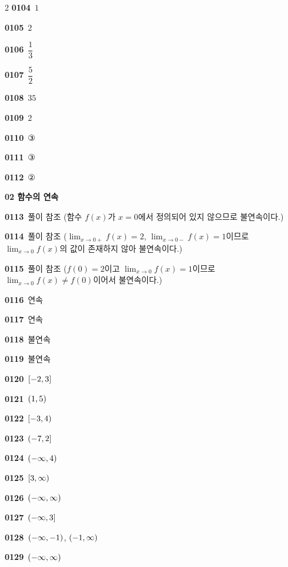 \documentclass[10pt,a4paper]{article}
\begin{document}
\begin{multicols}{2}
\noindent\textbf{0104}\ $1$\par
\noindent\textbf{0105}\ $2$\par
\noindent\textbf{0106}\ $\dfrac{1}{3}$\par
\noindent\textbf{0107}\ $\dfrac{5}{2}$\par
\noindent\textbf{0108}\ $35$\par
\noindent\textbf{0109}\ $2$\par
\noindent\textbf{0110}\ ③\par
\noindent\textbf{0111}\ ③\par
\noindent\textbf{0112}\ ②\par
\noindent\textbf{02 함수의 연속}\par\smallskip
\noindent\textbf{0113}\ 풀이 참조 (함수 $f(x)$가 $x=0$에서 정의되어 있지 않으므로 불연속이다.)\par
\noindent\textbf{0114}\ 풀이 참조 ($\displaystyle\lim_{x\to 0+}f(x)=2$, $\displaystyle\lim_{x\to 0-}f(x)=1$이므로 $\displaystyle\lim_{x\to 0}f(x)$의 값이 존재하지 않아 불연속이다.)\par
\noindent\textbf{0115}\ 풀이 참조 ($f(0)=2$이고 $\displaystyle\lim_{x\to 0}f(x)=1$이므로 $\displaystyle\lim_{x\to 0}f(x)\ne f(0)$이어서 불연속이다.)\par
\noindent\textbf{0116}\ 연속\par
\noindent\textbf{0117}\ 연속\par
\noindent\textbf{0118}\ 불연속\par
\noindent\textbf{0119}\ 불연속\par
\noindent\textbf{0120}\ $[-2{,}\mkern3mu\mathopen{}3]$\par
\noindent\textbf{0121}\ $(1{,}\mkern3mu\mathopen{}5)$\par
\noindent\textbf{0122}\ $[-3{,}\mkern3mu\mathopen{}4)$\par
\noindent\textbf{0123}\ $(-7{,}\mkern3mu\mathopen{}2]$\par
\noindent\textbf{0124}\ $(-\infty{,}\mkern3mu\mathopen{}4)$\par
\noindent\textbf{0125}\ $[3{,}\mkern3mu\mathopen{}\infty)$\par
\noindent\textbf{0126}\ $(-\infty{,}\mkern3mu\mathopen{}\infty)$\par
\noindent\textbf{0127}\ $(-\infty{,}\mkern3mu\mathopen{}3]$\par
\noindent\textbf{0128}\ $(-\infty{,}\mkern3mu\mathopen{}-1)$, $(-1{,}\mkern3mu\mathopen{}\infty)$\par
\noindent\textbf{0129}\ $(-\infty{,}\mkern3mu\mathopen{}\infty)$\par

\end{multicols}
\end{document}
